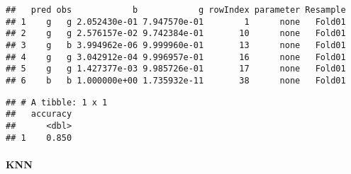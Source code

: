 \documentclass[]{article}
\newenvironment{Shaded}{\begin{snugshade}}{\end{snugshade}}
\newcommand{\DataTypeTok}[1]{\textcolor[rgb]{0.13,0.29,0.53}{#1}}
\newcommand{\KeywordTok}[1]{\textcolor[rgb]{0.13,0.29,0.53}{\textbf{#1}}}
\newcommand{\NormalTok}[1]{#1}
\newcommand{\OperatorTok}[1]{\textcolor[rgb]{0.81,0.36,0.00}{\textbf{#1}}}
\newcommand{\StringTok}[1]{\textcolor[rgb]{0.31,0.60,0.02}{#1}}
\let\oldparagraph\paragraph
\renewcommand{\paragraph}[1]{\oldparagraph{#1}\mbox{}}
\begin{document}
\begin{Shaded}
\end{Shaded}

\begin{verbatim}
##   pred obs            b            g rowIndex parameter Resample
## 1    g   g 2.052430e-01 7.947570e-01        1      none   Fold01
## 2    g   g 2.576157e-02 9.742384e-01       10      none   Fold01
## 3    g   b 3.994962e-06 9.999960e-01       13      none   Fold01
## 4    g   g 3.042912e-04 9.996957e-01       16      none   Fold01
## 5    g   g 1.427377e-03 9.985726e-01       17      none   Fold01
## 6    b   b 1.000000e+00 1.735932e-11       38      none   Fold01
\end{verbatim}

\begin{Shaded}
\end{Shaded}

\begin{verbatim}
## # A tibble: 1 x 1
##   accuracy
##      <dbl>
## 1    0.850
\end{verbatim}

\newpage

\hypertarget{knn}{%
\paragraph{KNN}\label{knn}}
\end{document}
